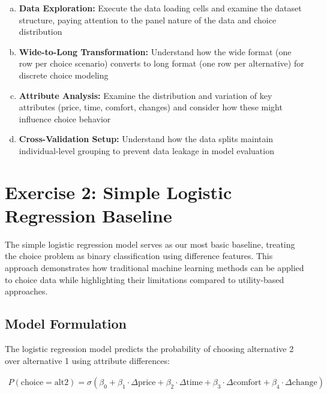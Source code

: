 \documentclass[11pt]{article}
\begin{document}
\begin{enumerate}[(a)]
\item \textbf{Data Exploration:} Execute the data loading cells and examine the dataset structure, paying attention to the panel nature of the data and choice distribution
\item \textbf{Wide-to-Long Transformation:} Understand how the wide format (one row per choice scenario) converts to long format (one row per alternative) for discrete choice modeling
\item \textbf{Attribute Analysis:} Examine the distribution and variation of key attributes (price, time, comfort, changes) and consider how these might influence choice behavior
\item \textbf{Cross-Validation Setup:} Understand how the data splits maintain individual-level grouping to prevent data leakage in model evaluation
\end{enumerate}

\section*{Exercise 2: Simple Logistic Regression Baseline}

\begin{center}
\end{center}

The simple logistic regression model serves as our most basic baseline, treating the choice problem as binary classification using difference features. This approach demonstrates how traditional machine learning methods can be applied to choice data while highlighting their limitations compared to utility-based approaches.

\subsection*{Model Formulation}

The logistic regression model predicts the probability of choosing alternative 2 over alternative 1 using attribute differences:

\begin{align}
P(\text{choice} = \text{alt2}) = \sigma(\beta_0 + \beta_1 \cdot \Delta\text{price} + \beta_2 \cdot \Delta\text{time} + \beta_3 \cdot \Delta\text{comfort} + \beta_4 \cdot \Delta\text{change})
\end{align}
\end{document}
